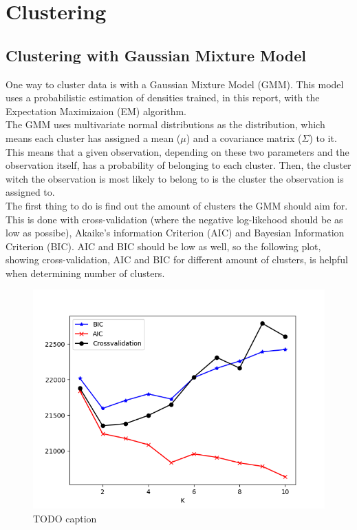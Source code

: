 \section{Clustering}


\subsection{Clustering with Gaussian Mixture Model}
One way to cluster data is with a Gaussian Mixture Model (GMM). This model uses a
probabilistic estimation of densities trained, in this report, with the
Expectation Maximizaion (EM) algorithm.\\
The GMM uses multivariate normal distributions as the distribution, which means
each cluster has assigned a mean ($\mu$) and a covariance matrix ($\Sigma$) to it.
This means that a given observation, depending on these two parameters and the
observation itself, has a probability of belonging to each cluster. Then, the
cluster witch the observation is most likely to belong to is the cluster the
observation is assigned to.\\
The first thing to do is find out the amount of clusters the GMM should aim for.
This is done with cross-validation (where the negative log-likehood should be
as low as possibe), Akaike's information Criterion (AIC) and Bayesian Information
Criterion (BIC). AIC and BIC should be low as well, so the following plot, showing
cross-validation, AIC and BIC for different amount of clusters, is helpful when
determining number of clusters.\\
\begin{figure}[htb]
  \centering
  \includegraphics[width=\textwidth]{Figure_1.png}
  \caption{TODO caption}
\end{figure}
